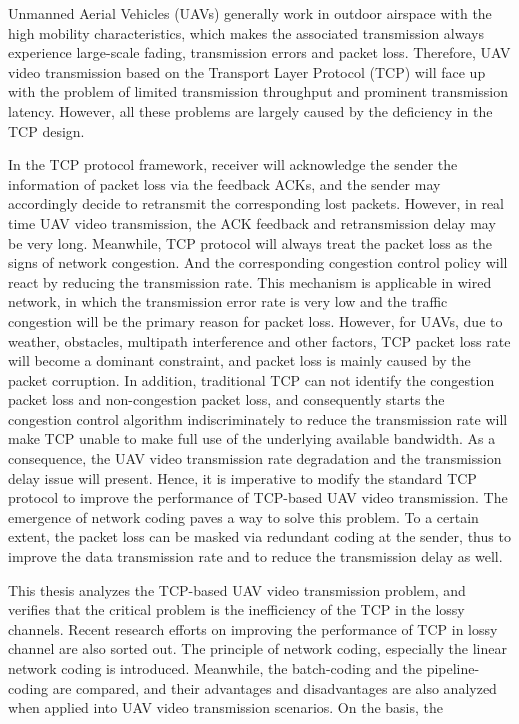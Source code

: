 
\eabstract
{
Unmanned Aerial Vehicles (UAVs) generally work in outdoor airspace with the high mobility characteristics, which makes the associated transmission always experience large-scale fading, transmission errors and packet loss. Therefore, UAV video transmission based on the Transport Layer Protocol (TCP) will face up with the problem of limited transmission throughput and prominent transmission latency. However, all these problems are largely caused by the deficiency in the TCP design.
	\par
 In the TCP protocol framework, receiver will acknowledge the sender the information of packet loss via the feedback ACKs, and the sender may accordingly decide to retransmit the corresponding lost packets. However, in real time UAV video transmission, the ACK feedback and retransmission delay may be very long. Meanwhile, TCP protocol will always treat the packet loss as the signs of network congestion. And the corresponding congestion control policy will react by reducing the transmission rate. This mechanism is applicable in wired network, in which the transmission error rate is very low and the traffic congestion will be the primary reason for packet loss. However, for UAVs, due to weather, obstacles, multipath interference and other factors, TCP packet loss rate will become a dominant constraint, and packet loss is mainly caused by the packet corruption. In addition, traditional TCP can not identify the congestion packet loss and non-congestion packet loss, and consequently starts the congestion control algorithm indiscriminately to reduce the transmission rate will make TCP unable to make full use of the underlying available bandwidth. As a consequence, the UAV video transmission rate degradation and the transmission delay issue will present. Hence, it is imperative to modify the standard TCP protocol to improve the performance of TCP-based UAV video transmission. The emergence of network coding paves a way to solve this problem. To a certain extent, the packet loss can be masked via redundant coding at the sender, thus to improve the data transmission rate and to reduce the transmission delay as well. 
	\par
This thesis analyzes the TCP-based UAV video transmission problem, and verifies that the critical problem is the inefficiency of the TCP in the lossy channels. Recent research efforts on improving the performance of TCP in lossy channel are also sorted out. The principle of network coding, especially the linear network coding is introduced. Meanwhile, the batch-coding and the pipeline-coding are compared, and their advantages and disadvantages are also analyzed when applied into UAV video transmission scenarios. On the basis, the
}

